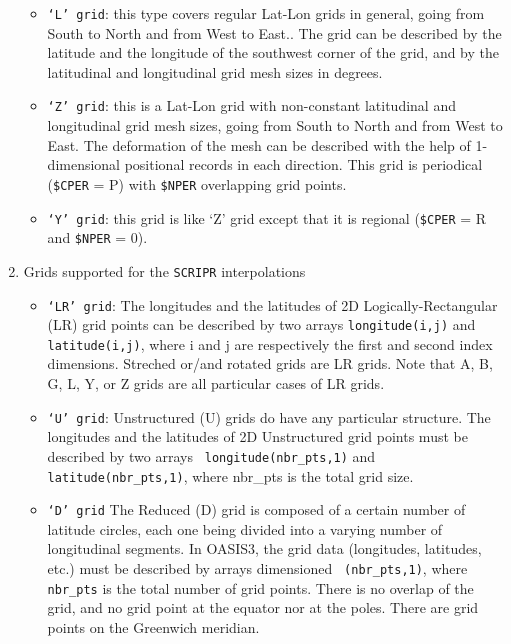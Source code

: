 \begin{enumerate}
\begin{itemize}
\item {\tt `L' grid}: this type covers regular Lat-Lon grids in
      general, going from South to
North and from West to East.. The grid can be described by the latitude and the
      longitude of the southwest corner of the grid, and by the
      latitudinal and longitudinal grid mesh sizes in degrees.

\item {\tt `Z' grid}: this is a Lat-Lon grid with non-constant
      latitudinal and longitudinal grid mesh sizes, going from South to
North and from West to East. The deformation of
      the mesh can be described with the help of 1-dimensional
      positional records in each direction. This grid is periodical
      ({\tt \$CPER} = P) with {\tt \$NPER} overlapping grid points.

\item {\tt `Y' grid}: this grid is like `Z' grid except that it is 
      regional ({\tt \$CPER} = R and {\tt \$NPER} = 0).
  
 \end{itemize}

\item Grids supported for the {\tt SCRIPR} interpolations

\begin{itemize}

\item {\tt `LR' grid}: The longitudes and the latitudes of
  2D Logically-Rectangular (LR) grid points can be described by two arrays
  {\tt longitude(i,j)} and {\tt latitude(i,j)}, where i and j
  are respectively the first and second index dimensions. Streched
  or/and rotated grids are LR grids. Note that A, B, G, L, Y, or Z
  grids are all particular cases of LR grids.

\item {\tt `U' grid}: Unstructured (U) grids do have any particular
      structure. The longitudes and the latitudes of 2D Unstructured
      grid points must be described by two arrays {\tt
      longitude(nbr\_pts,1)} and {\tt latitude(nbr\_pts,1)}, where nbr\_pts
      is the total grid size.

\item {\tt `D' grid} The Reduced (D) grid is composed of a certain
number of latitude circles, each one being divided into a varying
number of longitudinal segments. In OASIS3, the grid data (longitudes,
latitudes, etc.) must be described by arrays dimensioned {\tt
(nbr\_pts,1)}, where {\tt nbr\_pts} is the total number of grid
points. There is no overlap of the grid, and no grid point at the
equator nor at the poles. There are grid points on the Greenwich
meridian.
 
\end{itemize}

\end{enumerate}



